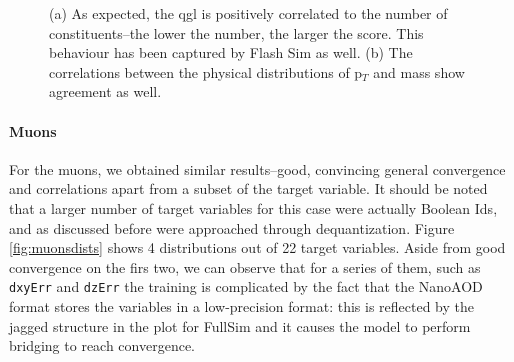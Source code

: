 \begin{figure}
    \myfloatalign
    \caption[qgl and p$_T$ correlations]{ (a) As expected, the qgl is positively correlated to the number of constituents--the lower the number, the larger the score. This behaviour has been captured by Flash Sim as well. (b) The correlations between the physical distributions of p$_T$ and mass show agreement as well.}\label{fig:corrjet2+3}
    
\end{figure}

\paragraph{Muons}

For the muons, we obtained similar results--good, convincing general convergence and correlations apart from a subset of the target variable. It should be noted that a larger number of target variables for this case were actually Boolean Ids, and as discussed before were approached through dequantization. Figure \ref{fig:muonsdists} shows 4 distributions out of 22 target variables. Aside from good convergence on the firs two, we can observe that for a series of them, such as \texttt{dxyErr} and \texttt{dzErr} the training is complicated by the fact that the NanoAOD format stores the variables in a low-precision format: this is reflected by the jagged structure in the plot for FullSim and it causes the model to perform bridging to reach convergence.

